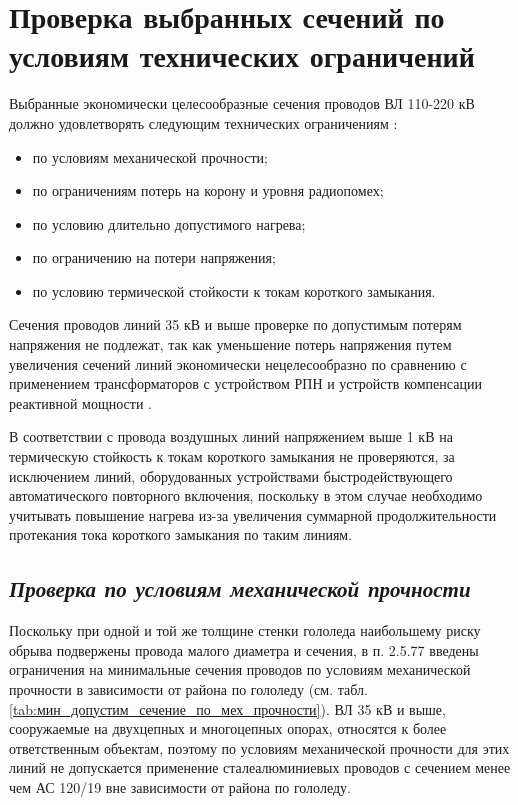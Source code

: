 \section{Проверка выбранных сечений по условиям технических ограничений}

Выбранные экономически целесообразные сечения проводов ВЛ 110-220 кВ должно удовлетворять следующим технических ограничениям \cite{глазунов_шведов}:
\begin{itemize}
	\item по условиям механической прочности;
	\item по ограничениям потерь на корону и уровня радиопомех;
	\item по условию длительно допустимого нагрева;
	\item по ограничению на потери напряжения;
	\item по условию термической стойкости к токам короткого замыкания.
\end{itemize}

Сечения проводов линий 35 кВ и выше проверке по допустимым потерям напряжения не подлежат, так как уменьшение потерь напряжения путем увеличения сечений линий экономически нецелесообразно по сравнению с применением трансформаторов с устройством РПН и устройств компенсации реактивной мощности \cite{файбисович}. 

В соответствии с \cite{пуэ7} провода воздушных линий напряжением выше 1 кВ на термическую стойкость к токам короткого замыкания не проверяются, за исключением линий, оборудованных устройствами быстродействующего автоматического повторного включения, поскольку в этом случае необходимо учитывать повышение нагрева из-за увеличения суммарной продолжительности протекания тока короткого замыкания по таким линиям.

\subsection*{\textit{Проверка по условиям механической прочности}}

Поскольку при одной и той же толщине стенки гололеда наибольшему риску обрыва подвержены провода малого диаметра и сечения, в п. 2.5.77 \cite{пуэ7} введены ограничения на минимальные сечения проводов по условиям механической прочности в зависимости от района по гололеду (см. табл. \ref{tab:мин_допустим_сечение_по_мех_прочности}). ВЛ 35 кВ и выше, сооружаемые на двухцепных и многоцепных опорах, относятся к более ответственным объектам, поэтому по условиям механической прочности для этих линий не допускается применение сталеалюминиевых проводов с сечением менее чем АС 120/19 вне зависимости от района по гололеду.

